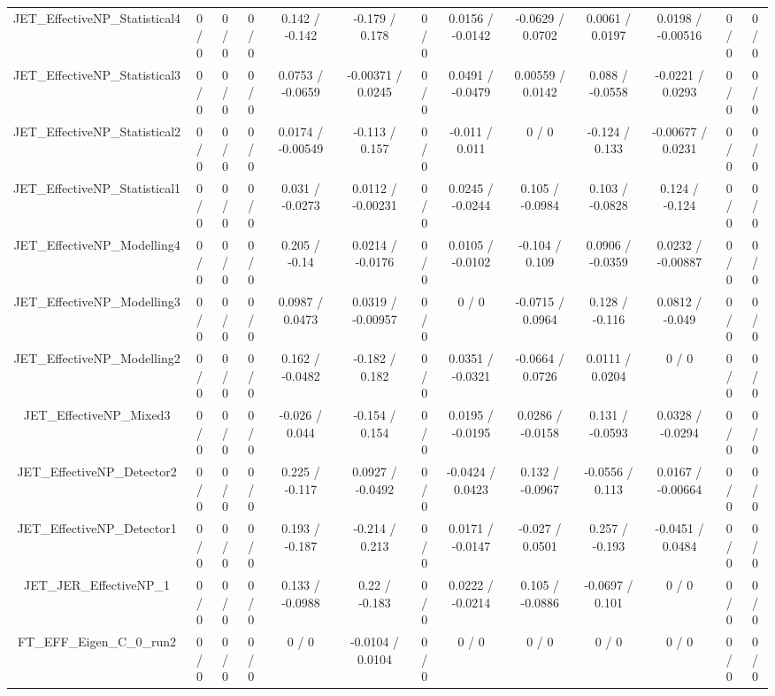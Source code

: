 \documentclass[10pt]{article}
\begin{document}
\begin{table}[htbp]
\begin{center}
\begin{tabular}{|c|c|c|c|c|c|c|c|c|c|c|c|c|}
  JET_EffectiveNP_Statistical4 & 0 / 0 & 0 / 0 & 0 / 0 & 0.142 / -0.142 & -0.179 / 0.178 & 0 / 0 & 0.0156 / -0.0142 & -0.0629 / 0.0702 & 0.0061 / 0.0197 & 0.0198 / -0.00516 & 0 / 0 & 0 / 0 \\ 
  JET_EffectiveNP_Statistical3 & 0 / 0 & 0 / 0 & 0 / 0 & 0.0753 / -0.0659 & -0.00371 / 0.0245 & 0 / 0 & 0.0491 / -0.0479 & 0.00559 / 0.0142 & 0.088 / -0.0558 & -0.0221 / 0.0293 & 0 / 0 & 0 / 0 \\ 
  JET_EffectiveNP_Statistical2 & 0 / 0 & 0 / 0 & 0 / 0 & 0.0174 / -0.00549 & -0.113 / 0.157 & 0 / 0 & -0.011 / 0.011 & 0 / 0 & -0.124 / 0.133 & -0.00677 / 0.0231 & 0 / 0 & 0 / 0 \\ 
  JET_EffectiveNP_Statistical1 & 0 / 0 & 0 / 0 & 0 / 0 & 0.031 / -0.0273 & 0.0112 / -0.00231 & 0 / 0 & 0.0245 / -0.0244 & 0.105 / -0.0984 & 0.103 / -0.0828 & 0.124 / -0.124 & 0 / 0 & 0 / 0 \\ 
  JET_EffectiveNP_Modelling4 & 0 / 0 & 0 / 0 & 0 / 0 & 0.205 / -0.14 & 0.0214 / -0.0176 & 0 / 0 & 0.0105 / -0.0102 & -0.104 / 0.109 & 0.0906 / -0.0359 & 0.0232 / -0.00887 & 0 / 0 & 0 / 0 \\ 
  JET_EffectiveNP_Modelling3 & 0 / 0 & 0 / 0 & 0 / 0 & 0.0987 / 0.0473 & 0.0319 / -0.00957 & 0 / 0 & 0 / 0 & -0.0715 / 0.0964 & 0.128 / -0.116 & 0.0812 / -0.049 & 0 / 0 & 0 / 0 \\ 
  JET_EffectiveNP_Modelling2 & 0 / 0 & 0 / 0 & 0 / 0 & 0.162 / -0.0482 & -0.182 / 0.182 & 0 / 0 & 0.0351 / -0.0321 & -0.0664 / 0.0726 & 0.0111 / 0.0204 & 0 / 0 & 0 / 0 & 0 / 0 \\ 
  JET_EffectiveNP_Mixed3 & 0 / 0 & 0 / 0 & 0 / 0 & -0.026 / 0.044 & -0.154 / 0.154 & 0 / 0 & 0.0195 / -0.0195 & 0.0286 / -0.0158 & 0.131 / -0.0593 & 0.0328 / -0.0294 & 0 / 0 & 0 / 0 \\ 
  JET_EffectiveNP_Detector2 & 0 / 0 & 0 / 0 & 0 / 0 & 0.225 / -0.117 & 0.0927 / -0.0492 & 0 / 0 & -0.0424 / 0.0423 & 0.132 / -0.0967 & -0.0556 / 0.113 & 0.0167 / -0.00664 & 0 / 0 & 0 / 0 \\ 
  JET_EffectiveNP_Detector1 & 0 / 0 & 0 / 0 & 0 / 0 & 0.193 / -0.187 & -0.214 / 0.213 & 0 / 0 & 0.0171 / -0.0147 & -0.027 / 0.0501 & 0.257 / -0.193 & -0.0451 / 0.0484 & 0 / 0 & 0 / 0 \\ 
  JET_JER_EffectiveNP_1 & 0 / 0 & 0 / 0 & 0 / 0 & 0.133 / -0.0988 & 0.22 / -0.183 & 0 / 0 & 0.0222 / -0.0214 & 0.105 / -0.0886 & -0.0697 / 0.101 & 0 / 0 & 0 / 0 & 0 / 0 \\ 
  FT_EFF_Eigen_C_0_run2 & 0 / 0 & 0 / 0 & 0 / 0 & 0 / 0 & -0.0104 / 0.0104 & 0 / 0 & 0 / 0 & 0 / 0 & 0 / 0 & 0 / 0 & 0 / 0 & 0 / 0 \\ 

\end{tabular}
\end{center}
\end{table}
\end{document}

